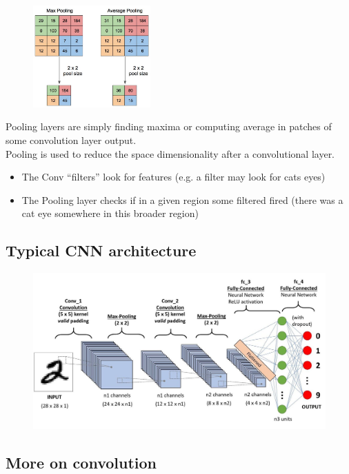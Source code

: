  \begin{figure}
 	\includegraphics[width=0.4\textwidth]{figure_ml/pooling.png}
 \end{figure}

Pooling layers are simply finding maxima or computing average in patches of some convolution layer output.\\
Pooling is used to reduce the space dimensionality after a convolutional layer.
\begin{itemize}
	\item The Conv “filters” look for features (e.g. a filter may look for cats eyes)
	\item The Pooling layer checks if in a given 	region some filtered fired (there was a cat eye somewhere in this broader region)
\end{itemize}

\subsection{Typical CNN architecture}

\begin{figure}[ht]
	\centering
	\includegraphics[width=1\linewidth]{figure_ml/cnn_arch.png}
\end{figure}
\FloatBarrier

\subsection{More on convolution}


